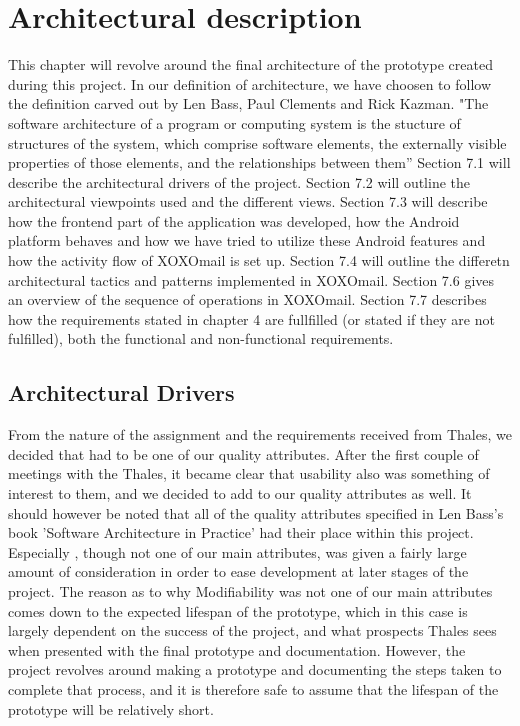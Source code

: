\chapter{Architectural description}
	This chapter will revolve around the final architecture of the prototype created during this project. In our definition of architecture, we have choosen to follow the definition carved out by
	Len Bass, Paul Clements and Rick Kazman. 
	\newline
	\newline
	"The software architecture of a program or computing system is the stucture of structures of the system, which comprise software elements, the externally visible properties of those elements, and the relationships between them''\cite[p. 3]{bib:archi}
	\newline
	\newline
	Section 7.1 will describe the architectural drivers of the project. Section 7.2 will outline the architectural viewpoints used and the different views. Section 7.3 will describe how the frontend part of the application was developed, how the Android platform behaves and how we have tried to utilize these Android features and how the activity flow of XOXOmail is set up. Section 7.4 will outline the differetn architectural tactics and patterns implemented in XOXOmail. Section 7.6 gives an overview of the sequence of operations in XOXOmail. Section 7.7 describes how the requirements stated in chapter 4 are fullfilled (or stated if they are not fulfilled), both the functional and non-functional requirements.  
	
\section{Architectural Drivers}
	From the nature of the assignment and the requirements received from Thales, we decided that  had to be one of our quality attributes. After the first couple of meetings with the Thales, it became clear that usability also was something of interest to them, and we decided to add  to our quality attributes as well. It should however be noted that all of the quality attributes specified in Len Bass's book 'Software Architecture in Practice'\cite{bib:archi} had their place within this project. Especially , though not one of our main attributes, was given a fairly large amount of consideration in order to ease development at later stages of the project. The reason as to why Modifiability was not one of our main attributes comes down to the expected lifespan of the prototype, which in this case is largely dependent on the success of the project, and what prospects Thales sees when presented with the final prototype and documentation. However, the project revolves around making a prototype and documenting the steps taken to complete that process, and it is therefore safe to assume that the lifespan of the prototype will be relatively short. 

